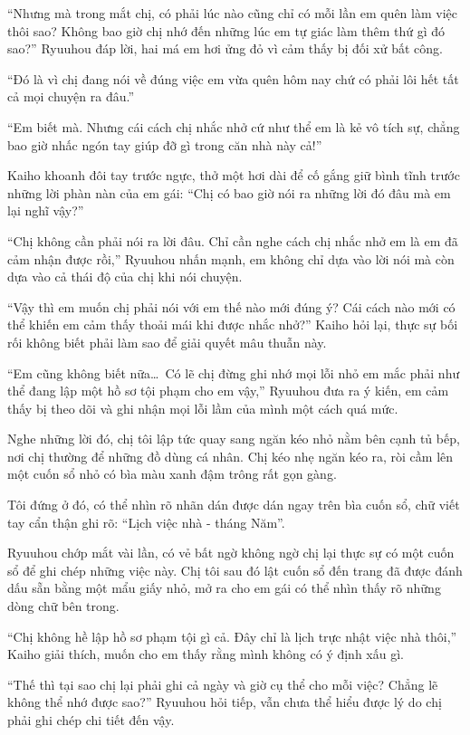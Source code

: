 \documentclass[../main.tex]{subfiles}
\begin{document}
``Nhưng mà trong mắt chị, có phải lúc nào cũng chỉ có mỗi lần em quên làm việc thôi sao? Không bao giờ chị nhớ đến những lúc em tự giác làm thêm thứ gì đó sao?'' Ryuuhou đáp lời, hai má em hơi ửng đỏ vì cảm thấy bị đối xử bất công.

``Đó là vì chị đang nói về đúng việc em vừa quên hôm nay chứ có phải lôi hết tất cả mọi chuyện ra đâu.''

``Em biết mà. Nhưng cái cách chị nhắc nhở cứ như thể em là kẻ vô tích sự, chẳng bao giờ nhấc ngón tay giúp đỡ gì trong căn nhà này cả!''

Kaiho khoanh đôi tay trước ngực, thở một hơi dài để cố gắng giữ bình tĩnh trước những lời phàn nàn của em gái: ``Chị có bao giờ nói ra những lời đó đâu mà em lại nghĩ vậy?''

``Chị không cần phải nói ra lời đâu. Chỉ cần nghe cách chị nhắc nhở em là em đã cảm nhận được rồi,'' Ryuuhou nhấn mạnh, em không chỉ dựa vào lời nói mà còn dựa vào cả thái độ của chị khi nói chuyện.

``Vậy thì em muốn chị phải nói với em thế nào mới đúng ý? Cái cách nào mới có thể khiến em cảm thấy thoải mái khi được nhắc nhở?'' Kaiho hỏi lại, thực sự bối rối không biết phải làm sao để giải quyết mâu thuẫn này.

``Em cũng không biết nữa\dots\ Có lẽ chị đừng ghi nhớ mọi lỗi nhỏ em mắc phải như thể đang lập một hồ sơ tội phạm cho em vậy,'' Ryuuhou đưa ra ý kiến, em cảm thấy bị theo dõi và ghi nhận mọi lỗi lầm của mình một cách quá mức.

Nghe những lời đó, chị tôi lập tức quay sang ngăn kéo nhỏ nằm bên cạnh tủ bếp, nơi chị thường để những đồ dùng cá nhân. Chị kéo nhẹ ngăn kéo ra, ròi cầm lên một cuốn sổ nhỏ có bìa màu xanh đậm trông rất gọn gàng.

Tôi đứng ở đó, có thể nhìn rõ nhãn dán được dán ngay trên bìa cuốn sổ, chữ viết tay cẩn thận ghi rõ: ``Lịch việc nhà - tháng Năm''.

Ryuuhou chớp mắt vài lần, có vẻ bất ngờ không ngờ chị lại thực sự có một cuốn sổ để ghi chép những việc này. Chị tôi sau đó lật cuốn sổ đến trang đã được đánh dấu sẵn bằng một mẩu giấy nhỏ, mở ra cho em gái có thể nhìn thấy rõ những dòng chữ bên trong.

``Chị không hề lập hồ sơ phạm tội gì cả. Đây chỉ là lịch trực nhật việc nhà thôi,'' Kaiho giải thích, muốn cho em thấy rằng mình không có ý định xấu gì.

``Thế thì tại sao chị lại phải ghi cả ngày và giờ cụ thể cho mỗi việc? Chẳng lẽ không thể nhớ được sao?'' Ryuuhou hỏi tiếp, vẫn chưa thể hiểu được lý do chị phải ghi chép chi tiết đến vậy.
\end{document}
